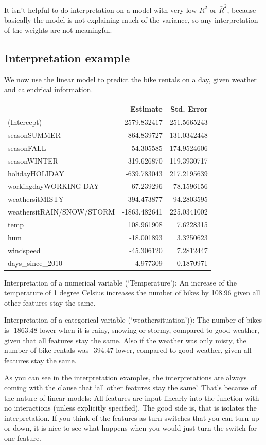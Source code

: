 \documentclass[12pt,]{krantz}
\theoremstyle{definition}
\theoremstyle{definition}
\theoremstyle{definition}
\theoremstyle{remark}
\begin{document}
It isn't helpful to do interpretation on a model with very low \(R^2\)
or \(\bar{R}^2\), because basically the model is not explaining much of
the variance, so any interpretation of the weights are not meaningful.

\subsection{Interpretation example}\label{interpretation-example}

We now use the linear model to predict the bike rentals on a day, given
weather and calendrical information.

\begin{tabular}{l|r|r}
\hline
  & Estimate & Std. Error\\
\hline
(Intercept) & 2579.832417 & 251.5665243\\
\hline
seasonSUMMER & 864.839727 & 131.0342448\\
\hline
seasonFALL & 54.305585 & 174.9524606\\
\hline
seasonWINTER & 319.626870 & 119.3930717\\
\hline
holidayHOLIDAY & -639.783043 & 217.2195639\\
\hline
workingdayWORKING DAY & 67.239296 & 78.1596156\\
\hline
weathersitMISTY & -394.473877 & 94.2803595\\
\hline
weathersitRAIN/SNOW/STORM & -1863.482641 & 225.0341002\\
\hline
temp & 108.961908 & 7.6228315\\
\hline
hum & -18.001893 & 3.3250623\\
\hline
windspeed & -45.306120 & 7.2812447\\
\hline
days\_since\_2010 & 4.977309 & 0.1870971\\
\hline
\end{tabular}

Interpretation of a numerical variable (`Temperature'): An increase of
the temperature of 1 degree Celsius increases the number of bikes by
108.96 given all other features stay the same.

Interpretation of a categorical variable (`weathersituation')): The
number of bikes is -1863.48 lower when it is rainy, snowing or stormy,
compared to good weather, given that all features stay the same. Also if
the weather was only misty, the number of bike rentals was -394.47
lower, compared to good weather, given all features stay the same.

As you can see in the interpretation examples, the interpretations are
always coming with the clause that `all other features stay the same'.
That's because of the nature of linear models: All features are input
linearly into the function with no interactions (unless explicitly
specified). The good side is, that is isolates the interpretation. If
you think of the features as turn-switches that you can turn up or down,
it is nice to see what happens when you would just turn the switch for
one feature.
\end{document}
